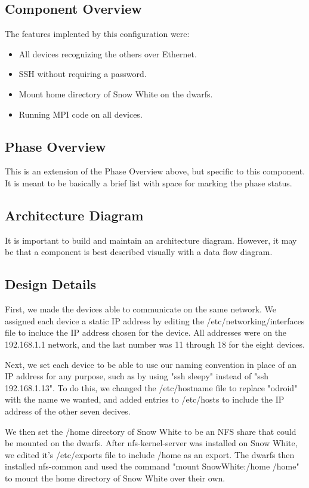 \subsection{Component  Overview}
The features implented by this configuration were:

\begin{itemize}
	\item All devices recognizing the others over Ethernet.
	\item SSH without requiring a password.
	\item Mount home directory of Snow White on the dwarfs.
	\item Running MPI code on all devices.
\end{itemize}

\subsection{Phase Overview}
This is an extension of the Phase Overview above, but specific to this component. 
 It is meant to be basically a brief list with space for marking the phase status. 

\subsection{ Architecture  Diagram}
It is important to build and maintain an architecture diagram.  However, it may 
be that a component is best described visually with a data flow diagram. 

\subsection{Design Details}
First, we made the devices able to communicate on the same network. We assigned each device a static IP address by editing the /etc/networking/interfaces file to incluce the IP address chosen for the device. All addresses were on the 192.168.1.1 network, and the last number was 11 through 18 for the eight devices.

Next, we set each device to be able to use our naming convention in place of an IP address for any purpose, such as by using "ssh sleepy" instead of "ssh 192.168.1.13". To do this, we changed the /etc/hostname file to replace "odroid" with the name we wanted, and added entries to /etc/hosts to include the IP address of the other seven decives. 

We then set the /home directory of Snow White to be an NFS share that could be mounted on the dwarfs. After nfs-kernel-server was installed on Snow White, we edited it's /etc/exports file to include /home as an export. The dwarfs then installed nfs-common and used the command "mount SnowWhite:/home /home" to mount the home directory of Snow White over their own.

